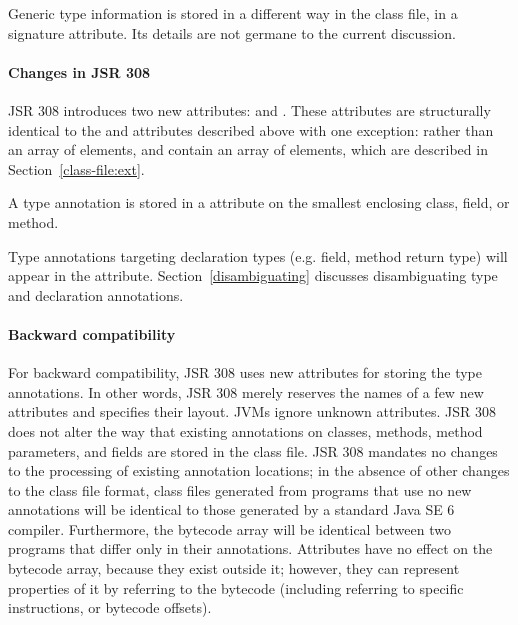 \documentclass[10pt]{article}
\begin{document}
Generic type information is stored in a different way in the class file, in
a signature attribute.  Its details are not germane to the current
discussion.


\paragraph{Changes in JSR 308}
JSR 308 introduces two new attributes:
\RuntimeVisibleTypeAnnotations and
\RuntimeInvisibleTypeAnnotations. These attributes are
structurally identical to the \RuntimeVisibleAnnotations and
\RuntimeInvisibleAnnotations attributes described above with one
exception: rather than an array of  elements,
\RuntimeVisibleTypeAnnotations and
\RuntimeInvisibleTypeAnnotations contain an array of
\extendedannotation elements, which are described in
Section~\ref{class-file:ext}.


A type annotation is stored in a \RuntimeInOrVisibleTypeAnnotations attribute
on the smallest enclosing class, field, or method.

Type annotations targeting declaration types (e.g. field, method return type)
will appear in the \RuntimeInOrVisibleTypeAnnotations attribute.
Section~\ref{disambiguating} discusses disambiguating type and declaration
annotations.

\paragraph{Backward compatibility}
For backward compatibility, JSR 308 uses new attributes for storing
the type annotations.  In other words, JSR 308 merely reserves the
names of a few new attributes and specifies their layout.
JVMs ignore unknown
attributes.
JSR 308 does
not alter the way that existing annotations on classes, methods, method parameters,
and fields are stored in the class file.
JSR 308 mandates no changes to the processing of existing annotation locations;
in the absence of other changes to the class file format,
class files generated from programs that use no new
annotations will be identical to those generated by a standard Java SE 6
compiler.
Furthermore, the bytecode array will be identical between two programs that
differ only in their annotations.
Attributes have no effect on the bytecode array, because they exist outside
it; however, they can represent properties of it by referring to the
bytecode (including referring to specific instructions, or bytecode offsets).
\end{document}
